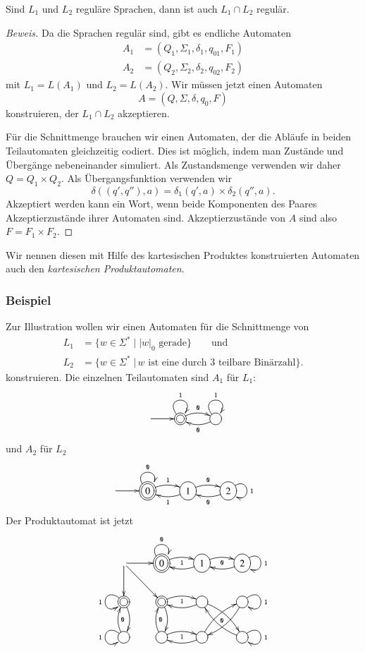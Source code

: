 \begin{satz}
\label{satz_intersection}
Sind $L_1$ und $L_2$ reguläre Sprachen, dann
ist auch $L_1\cap L_2$ regulär.
\end{satz}

\begin{proof}[Beweis]
Da die Sprachen regulär sind, gibt es endliche Automaten 
\begin{align*}
A_1&=(Q_1,\Sigma_1,\delta_1, q_{01}, F_1)\\
A_2&=(Q_2,\Sigma_2,\delta_2, q_{02}, F_2)
\end{align*}
mit $L_1=L(A_1)$ und $L_2=L(A_2)$.
Wir müssen jetzt einen Automaten
\[
A = (Q, \Sigma, \delta, q_0, F)
\]
konstruieren, der $L_1\cap L_2$ akzeptieren.

Für die Schnittmenge brauchen wir einen Automaten, der die Abläufe 
in beiden Teilautomaten gleichzeitig codiert.
Dies ist möglich, indem man Zustände und Übergänge nebeneinander
simuliert.
Als Zustandsmenge verwenden wir daher $Q=Q_1\times Q_2$.
Als Übergangsfunktion verwenden wir
\[
\delta((q',q''),a)=\delta_1(q',a)\times \delta_2(q'',a).
\]
Akzeptiert werden kann ein Wort, wenn beide Komponenten des Paares 
Akzeptierzustände ihrer Automaten sind.
Akzeptierzustände von $A$ sind also $F=F_1\times F_2$.
\end{proof}

Wir nennen diesen mit Hilfe des kartesischen Produktes konstruierten
Automaten auch den
{\em kartesischen Produktautomaten}\label{reg_produktautomat}.

\subsubsection{Beispiel}
Zur Illustration wollen 
wir einen Automaten für die Schnittmenge von
\begin{align*}
L_1&=\{w\in\Sigma^*\;|\; \text{$|w|_0$ gerade}\}\qquad\text{und}\\
L_2&=\{w\in\Sigma^*\;|\,\text{$w$ ist eine durch 3 teilbare Binärzahl}\}.
\end{align*}
konstruieren.
Die einzelnen Teilautomaten sind $A_1$ für $L_1$:
\[
\entrymodifiers={++[o][F]}
\xymatrix{
*+\txt{}\ar[r]
	&*++[o][F=]{} \ar@/^/[r]^{\tt 0} \ar@(ul,ur)^{\tt 1}
		&{} \ar@/^/[l]^{\tt 0} \ar@(ul,ur)^{\tt 1}
}
\]
und $A_2$ für $L_2$
\[
\entrymodifiers={++[o][F]}
\xymatrix{
*+\txt{}\ar[r]
	&*++[o][F=]{0} \ar@/^/[r]^{\tt 1} \ar@(ul,ur)^{\tt 0}
		&{1} \ar@/^/[l]^{\tt 1} \ar@/^/[r]^{\tt 0}
			&{2}\ar@(ur,dr)^{\tt 1} \ar@/^/[l]^{\tt 0}
}
\]
Der Produktautomat ist jetzt
\[
\entrymodifiers={++[o][F]}
\xymatrix{
*+\txt{} \ar[r] \ar[d] \ar[dr]
	&*++[o][F=]{0} \ar@/^/[r]_{\tt 1} \ar@(ul,ur)^{\tt 0}
		&{1} \ar@/^/[l] \ar@/^/[r]_{\tt 0}
			&{2}\ar@(ur,dr)^{\tt 1} \ar@/^/[l]
\\
*++[o][F=]{} \ar@/^/[d] \ar@(ul,dl)_{\tt 1}
	&*++[o][F=]{} \ar@/^/[d]{\tt 0} \ar@/^/[r]_{\tt 1}
		&{} \ar@/^/[l] \ar@/^/[dr]_{\tt 0}
			&{}\ar@(ur,dr)^{\tt 1} \ar@/^/[dl]
\\
{} \ar@/^/[u]_{\tt 0} \ar@(ul,dl)_{\tt 1}
	&{} \ar@/^/[u]_{\tt 0} \ar@/^/[r]_{\tt 1}
		&{} \ar@/^/[l] \ar@/^/[ur]
			&{}\ar@(ur,dr)^{\tt 1} \ar@/^/[ul]
}
\]

